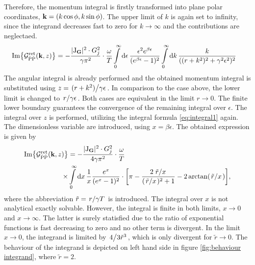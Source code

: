 Therefore, the momentum integral is firstly transformed into plane polar coordinates, $\vb{k} = (k\cos\phi, k\sin\phi)$.
The upper limit of $k$ is again set to infinity, since the integrand decreases fast to zero for $k \to \infty$ and the contributions are neglectaed.
%
\begin{align}
	\Im{\mathcal{G}_{\dot{\mathrm{P}}\dot{\mathrm{P}}}^{\mathrm{ret}}(\vb{k}, z)} &= 
		-\frac{\vert \mathrm{J}_{\vb{G}} \vert^{2} \cdot G_{j}^{2}}{\gamma \pi^{2}} \cdot 
		\frac{\omega}{T}
		\int\limits_{0}^{\infty} \dd{\epsilon}
		\frac{\epsilon^{2} e^{\beta \epsilon}}{(e^{\beta \epsilon} - 1)^{2}}
		\int\limits_{0}^{\infty} \dd{k}
		\frac{k}{((r + k^{2})^{2} + \gamma^{2} \epsilon^{2})^{2}}
	\label{eq:starting expression}
\end{align}
%
The angular integral is already performed and the obtained momentum integral is substituted using $z = \flatfrac{(r + k^{2})}{\gamma\epsilon}$.
In comparison to the case above, the lower limit is changed to $\flatfrac{r}{\gamma \epsilon}$.
Both cases are equivalent in the limit $r \to 0$.
The finite lower boundary guarantees the convergence of the remaining integral over $\epsilon$.
The integral over $z$ is performed, utilizing the integral formula \eqref{eq:integral1} again.
The dimensionless variable are introduced, using $x = \beta \epsilon$.
The obtained expression is given by
%
\begin{align}
	\Im{\mathcal{G}_{\dot{\mt{P}}\dot{\mt{P}}}^{\mt{ret}}(\vb{k}, z)} &= 
		-\frac{\vert \mt{J}_{\vb{G}} \vert^{2} \cdot G_{j}^{2}}{4 \gamma \pi^{2}} \cdot 
		\frac{\omega}{T}
		\notag \\
		\times &\int\limits_{0}^{\infty} \dd{x}
		\frac{1}{x} \frac{e^{x}}{(e^{x} - 1)^{2}} \cdot
		\bigg[\pi - \frac{2 \flatfrac{\tilde{r}}{x}}{(\flatfrac{\tilde{r}}{x})^2 + 1} - 2 \arctan(\flatfrac{\tilde{r}}{x})\bigg],
	\label{eq:figure behaviour integrand}
\end{align}
%
where the abbreviation $\tilde{r} = \flatfrac{r}{\gamma T}$ is introduced.
The integral over $x$ is not analytical exactly solvable.
However, the integral is finite in both limits, $x \to 0$ and $x \to \infty$.
The latter is surely statisfied due to the ratio of exponential functions is fast decreasing to zero and no other term is divergent.
In the limit $x \to 0$, the integrand is limited by $\flatfrac{4}{3\tilde{r}^{3}}$, which is only divergent for $\tilde{r} \to 0$.
The behaviour of the integrand is depicted on left hand side in figure \ref{fig:behaviour integrand}, where $\tilde{r} = 2$.
%
